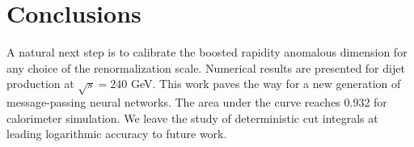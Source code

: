 \section{Conclusions}\label{sec:conclusions}

A natural next step is to calibrate the boosted rapidity anomalous
dimension for any choice of the renormalization scale. Numerical results
are presented for dijet production at $\sqrt{s} = 240$ GeV. This work
paves the way for a new generation of message-passing neural networks.
The area under the curve reaches 0.932 for calorimeter simulation. We
leave the study of deterministic cut integrals at leading logarithmic
accuracy to future work.

